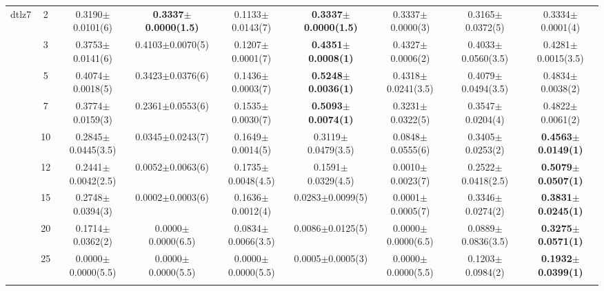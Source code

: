 \begin{table*}[htbp]
\begin{adjustbox}{width=1.0\textwidth,center}
\begin{tabular}{ccccccccc}
dtlz7 & 2          & 0.3190$\pm$0.0101(6)   & \textbf{0.3337$\pm$0.0000(1.5)} & 0.1133$\pm$0.0143(7)   & \textbf{0.3337$\pm$0.0000(1.5)}  & 0.3337$\pm$0.0000(3)            & 0.3165$\pm$0.0372(5)            & 0.3334$\pm$0.0001(4)            \\
      & 3          & 0.3753$\pm$0.0141(6)   & 0.4103$\pm$0.0070(5)            & 0.1207$\pm$0.0001(7)   & \textbf{0.4351$\pm$0.0008(1)}    & 0.4327$\pm$0.0006(2)            & 0.4033$\pm$0.0560(3.5)          & 0.4281$\pm$0.0015(3.5)          \\
      & 5          & 0.4074$\pm$0.0018(5)   & 0.3423$\pm$0.0376(6)            & 0.1436$\pm$0.0003(7)   & \textbf{0.5248$\pm$0.0036(1)}    & 0.4318$\pm$0.0241(3.5)          & 0.4079$\pm$0.0494(3.5)          & 0.4834$\pm$0.0038(2)            \\
      & 7          & 0.3774$\pm$0.0159(3)   & 0.2361$\pm$0.0553(6)            & 0.1535$\pm$0.0030(7)   & \textbf{0.5093$\pm$0.0074(1)}    & 0.3231$\pm$0.0322(5)            & 0.3547$\pm$0.0204(4)            & 0.4822$\pm$0.0061(2)            \\
      & 10         & 0.2845$\pm$0.0445(3.5) & 0.0345$\pm$0.0243(7)            & 0.1649$\pm$0.0014(5)   & 0.3119$\pm$0.0479(3.5)           & 0.0848$\pm$0.0555(6)            & 0.3405$\pm$0.0253(2)            & \textbf{0.4563$\pm$0.0149(1)}   \\
      & 12         & 0.2441$\pm$0.0042(2.5) & 0.0052$\pm$0.0063(6)            & 0.1735$\pm$0.0048(4.5) & 0.1591$\pm$0.0329(4.5)           & 0.0010$\pm$0.0023(7)            & 0.2522$\pm$0.0418(2.5)          & \textbf{0.5079$\pm$0.0507(1)}   \\
      & 15         & 0.2748$\pm$0.0394(3)   & 0.0002$\pm$0.0003(6)            & 0.1636$\pm$0.0012(4)   & 0.0283$\pm$0.0099(5)             & 0.0001$\pm$0.0005(7)            & 0.3346$\pm$0.0274(2)            & \textbf{0.3831$\pm$0.0245(1)}   \\
      & 20         & 0.1714$\pm$0.0362(2)   & 0.0000$\pm$0.0000(6.5)          & 0.0834$\pm$0.0066(3.5) & 0.0086$\pm$0.0125(5)             & 0.0000$\pm$0.0000(6.5)          & 0.0889$\pm$0.0836(3.5)          & \textbf{0.3275$\pm$0.0571(1)}   \\
      & 25         & 0.0000$\pm$0.0000(5.5) & 0.0000$\pm$0.0000(5.5)          & 0.0000$\pm$0.0000(5.5) & 0.0005$\pm$0.0005(3)             & 0.0000$\pm$0.0000(5.5)          & 0.1203$\pm$0.0984(2)            & \textbf{0.1932$\pm$0.0399(1)}  \\\thickhline
\end{tabular}
\end{adjustbox}
\end{table*}